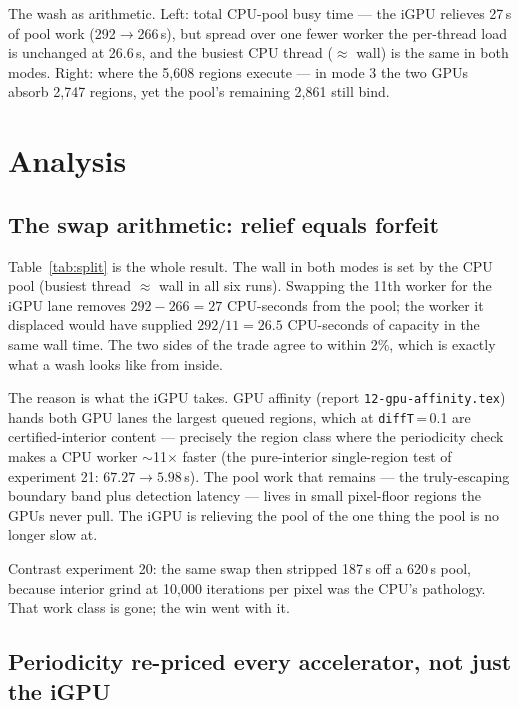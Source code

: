 \documentclass[
	english,
	letterpaper, oneside
]{article}
\begin{document}
            {The wash as arithmetic. Left: total CPU-pool busy time --- the
             iGPU relieves 27\,s of pool work (292$\to$266\,s), but spread
             over one fewer worker the per-thread load is unchanged at
             26.6\,s, and the busiest CPU thread ($\approx$ wall) is the same
             in both modes. Right: where the 5{,}608 regions execute --- in
             mode 3 the two GPUs absorb 2{,}747 regions, yet the pool's
             remaining 2{,}861 still bind. \label{fig:accounting}}

\section{Analysis}

\subsection{The swap arithmetic: relief equals forfeit}

Table~\ref{tab:split} is the whole result. The wall in both modes is set by
the CPU pool (busiest thread $\approx$ wall in all six runs). Swapping the
11th worker for the iGPU lane removes $292-266=27$ CPU-seconds from the
pool; the worker it displaced would have supplied $292/11=26.5$
CPU-seconds of capacity in the same wall time. The two sides of the trade
agree to within 2\%, which is exactly what a wash looks like from inside.

The reason is what the iGPU takes. GPU affinity (report
\texttt{12-gpu-affinity.tex}) hands both GPU lanes the largest queued
regions, which at \texttt{diffT}\,=\,0.1 are certified-interior content ---
precisely the region class where the periodicity check makes a CPU worker
$\sim$11$\times$ faster (the pure-interior single-region test of experiment
21: $67.27\to5.98$\,s). The pool work that remains --- the truly-escaping
boundary band plus detection latency --- lives in small pixel-floor regions
the GPUs never pull. The iGPU is relieving the pool of the one thing the
pool is no longer slow at.

Contrast experiment 20: the same swap then stripped 187\,s off a 620\,s
pool, because interior grind at 10{,}000 iterations per pixel was the CPU's
pathology. That work class is gone; the win went with it.

\subsection{Periodicity re-priced every accelerator, not just the iGPU}
\label{sec:reprice}
\end{document}
